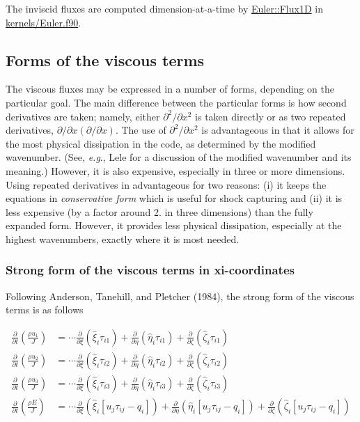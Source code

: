 The inviscid fluxes are computed dimension-\/at-\/a-\/time by \hyperlink{namespaceeuler_a75d1a7e992d0b046ee381c90d22d4c44}{Euler\+:\+:Flux1D} in \hyperlink{Euler_8f90}{kernels/\+Euler.\+f90}.\hypertarget{theory_viscousForms}{}\subsection{Forms of the viscous terms}\label{theory_viscousForms}
The viscous fluxes may be expressed in a number of forms, depending on the particular goal. The main difference between the particular forms is how second derivatives are taken; namely, either $\partial^2/\partial x^2$ is taken directly or as two repeated derivatives, $\partial/\partial x\left(\partial/\partial x\right)$. The use of $\partial^2/\partial x^2$ is advantageous in that it allows for the most physical dissipation in the code, as determined by the modified wavenumber. (See, {\itshape e.\+g}., Lele\cite{lele:1992} for a discussion of the modified wavenumber and its meaning.) However, it is also expensive, especially in three or more dimensions. Using repeated derivatives in advantageous for two reasons\+: (i) it keeps the equations in {\itshape conservative form} which is useful for shock capturing and (ii) it is less expensive (by a factor around 2. in three dimensions) than the fully expanded form. However, it provides less physical dissipation, especially at the highest wavenumbers, exactly where it is most needed.\hypertarget{theory_strongVisc}{}\subsubsection{Strong form of the viscous terms in xi-\/coordinates}\label{theory_strongVisc}
Following Anderson, Tanehill, and Pletcher (1984), the strong form of the viscous terms is as follows

\[ \begin{align} \frac{\partial}{\partial t}\left(\frac{\rho u_1}{J}\right) &= \cdots \frac{\partial}{\partial \xi}\left(\hat{\xi}_i\tau_{i1}\right) + \frac{\partial}{\partial \eta}\left(\hat{\eta}_i\tau_{i1}\right) + \frac{\partial}{\partial \zeta}\left(\hat{\zeta}_i\tau_{i1}\right) \\ \frac{\partial}{\partial t}\left(\frac{\rho u_2}{J}\right) &= \cdots \frac{\partial}{\partial \xi}\left(\hat{\xi}_i\tau_{i2}\right) + \frac{\partial}{\partial \eta}\left(\hat{\eta}_i\tau_{i2}\right) + \frac{\partial}{\partial \zeta}\left(\hat{\zeta}_i\tau_{i2}\right) \\ \frac{\partial}{\partial t}\left(\frac{\rho u_3}{J}\right) &= \cdots \frac{\partial}{\partial \xi}\left(\hat{\xi}_i\tau_{i3}\right) + \frac{\partial}{\partial \eta}\left(\hat{\eta}_i\tau_{i3}\right) + \frac{\partial}{\partial \zeta}\left(\hat{\zeta}_i\tau_{i3}\right) \\ \frac{\partial}{\partial t}\left(\frac{\rho E}{J}\right) &= \cdots \frac{\partial}{\partial \xi}\left(\hat{\xi}_i [ u_j \tau_{ij} - q_i ]\right) + \frac{\partial}{\partial \eta}\left(\hat{\eta}_i [ u_j \tau_{ij} - q_i ]\right) + \frac{\partial}{\partial \zeta}\left(\hat{\zeta}_i [ u_j \tau_{ij} - q_i ]\right) \end{align} \]

